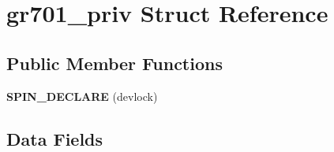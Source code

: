 \hypertarget{structgr701__priv}{}\section{gr701\+\_\+priv Struct Reference}
\label{structgr701__priv}
\subsection*{Public Member Functions}
\begin{DoxyCompactItemize}
\item 
\mbox{\label{structgr701__priv_a38c0dfdb95fe03b08e8b6ba68b266985}} 
{\bfseries S\+P\+I\+N\+\_\+\+D\+E\+C\+L\+A\+RE} (devlock)
\end{DoxyCompactItemize}
\subsection*{Data Fields}

